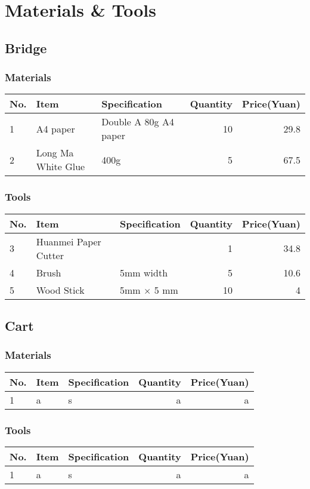 \section{Materials \& Tools}
\subsection{Bridge}
\subsubsection{Materials}


\newcommand{\beginMyTabular}{
    \begin{tabular}{p{2cm}p{3cm}p{7cm}rr}
}
\begin{center}
\beginMyTabular
\hline
No. & Item & Specification & Quantity & Price(Yuan) \\
\hline
1 & A4 paper & Double A 80g  A4 paper  & 10 & 29.8 \\
2 & Long Ma White Glue & 400g & 5 & 67.5 \\
\end{tabular}
\end{center}


\subsubsection{Tools}


\begin{center}
\beginMyTabular
\hline
No. & Item & Specification & Quantity & Price(Yuan) \\
\hline
3 & Huanmei Paper Cutter & & 1 & 34.8 \\
4 & Brush & 5mm width & 5 & 10.6 \\
5 & Wood Stick & 5mm $\times $ 5 mm & 10 & 4 \\ 
\end{tabular}
\end{center}

\subsection{Cart}
\subsubsection{Materials}


\begin{center}
\beginMyTabular
\hline
No. & Item & Specification & Quantity & Price(Yuan) \\
\hline
1 & a & s & a & a
\end{tabular}
\end{center}
\subsubsection{Tools}

\begin{center}
\beginMyTabular
\hline
No. & Item & Specification & Quantity & Price(Yuan) \\
\hline
1 & a & s & a & a
\end{tabular}
\end{center}